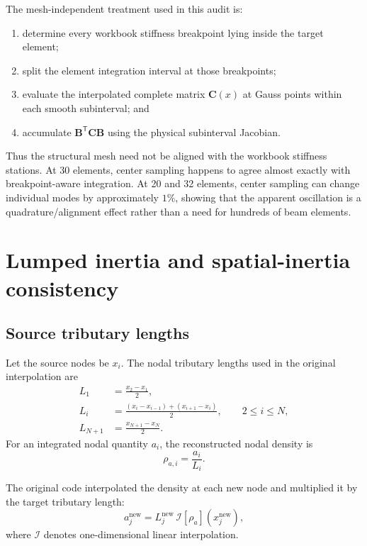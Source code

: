 \documentclass[11pt,a4paper]{article}
\newcommand{\mat}[1]{\bm{#1}}
\begin{document}
The mesh-independent treatment used in this audit is:
\begin{enumerate}
  \item determine every workbook stiffness breakpoint lying inside the
        target element;
  \item split the element integration interval at those breakpoints;
  \item evaluate the interpolated complete matrix \(\mat C(x)\) at Gauss
        points within each smooth subinterval; and
  \item accumulate \(\mat B^{\mathsf T}\mat C\mat B\) using the physical
        subinterval Jacobian.
\end{enumerate}

Thus the structural mesh need not be aligned with the workbook stiffness
stations.  At 30 elements, center sampling happens to agree almost exactly
with breakpoint-aware integration.  At 20 and 32 elements, center sampling
can change individual modes by approximately \(1\%\), showing that the
apparent oscillation is a quadrature/alignment effect rather than a need for
hundreds of beam elements.

\section{Lumped inertia and spatial-inertia consistency}

\subsection{Source tributary lengths}

Let the source nodes be \(x_i\).  The nodal tributary lengths used in the
original interpolation are
\begin{align}
L_1 &= \frac{x_2-x_1}{2},\\
L_i &= \frac{(x_i-x_{i-1})+(x_{i+1}-x_i)}{2},
       \qquad 2\le i\le N,\\
L_{N+1} &= \frac{x_{N+1}-x_N}{2}.
\end{align}
For an integrated nodal quantity \(a_i\), the reconstructed nodal density is
\begin{equation}
\rho_{a,i}=\frac{a_i}{L_i}.
\end{equation}

The original code interpolated the density at each new node and multiplied it
by the target tributary length:
\begin{equation}
a_j^{\mathrm{new}} =
L_j^{\mathrm{new}}\,
\mathcal{I}\!\left[\rho_a\right](x_j^{\mathrm{new}}),
\end{equation}
where \(\mathcal I\) denotes one-dimensional linear interpolation.
\end{document}
